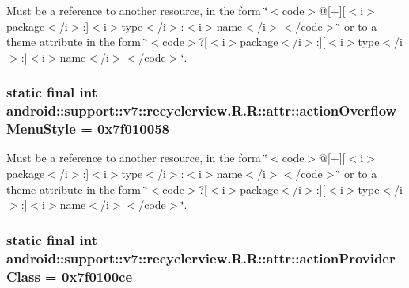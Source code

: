 Must be a reference to another resource, in the form \char`\"{}$<$code$>$@\mbox{[}+\mbox{]}\mbox{[}$<$i$>$package$<$/i$>$:\mbox{]}$<$i$>$type$<$/i$>$:$<$i$>$name$<$/i$>$$<$/code$>$\char`\"{} or to a theme attribute in the form \char`\"{}$<$code$>$?\mbox{[}$<$i$>$package$<$/i$>$:\mbox{]}\mbox{[}$<$i$>$type$<$/i$>$:\mbox{]}$<$i$>$name$<$/i$>$$<$/code$>$\char`\"{}. \hypertarget{classandroid_1_1support_1_1v7_1_1recyclerview_1_1_r_1_1attr_20fca3ec1f7d157c212c1aa8b54e0c41}{
\subsubsection[{actionOverflowMenuStyle}]{\setlength{\rightskip}{0pt plus 5cm}static final int android::support::v7::recyclerview.R.R::attr::actionOverflowMenuStyle = 0x7f010058}}
\label{classandroid_1_1support_1_1v7_1_1recyclerview_1_1_r_1_1attr_20fca3ec1f7d157c212c1aa8b54e0c41}


Must be a reference to another resource, in the form \char`\"{}$<$code$>$@\mbox{[}+\mbox{]}\mbox{[}$<$i$>$package$<$/i$>$:\mbox{]}$<$i$>$type$<$/i$>$:$<$i$>$name$<$/i$>$$<$/code$>$\char`\"{} or to a theme attribute in the form \char`\"{}$<$code$>$?\mbox{[}$<$i$>$package$<$/i$>$:\mbox{]}\mbox{[}$<$i$>$type$<$/i$>$:\mbox{]}$<$i$>$name$<$/i$>$$<$/code$>$\char`\"{}. \hypertarget{classandroid_1_1support_1_1v7_1_1recyclerview_1_1_r_1_1attr_3f43e273e9da40d26ca267ace58366b1}{
\subsubsection[{actionProviderClass}]{\setlength{\rightskip}{0pt plus 5cm}static final int android::support::v7::recyclerview.R.R::attr::actionProviderClass = 0x7f0100ce}}
\label{classandroid_1_1support_1_1v7_1_1recyclerview_1_1_r_1_1attr_3f43e273e9da40d26ca267ace58366b1}


